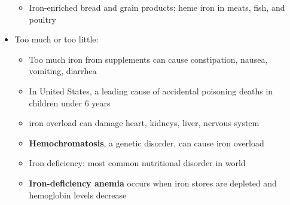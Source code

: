 \documentclass[12pt]{article}
\begin{document}
\begin{itemize}
\begin{itemize}
                        \item Iron-enriched bread and grain products; heme iron in meats, fish, and poultry
                    \end{itemize}
                \item Too much or too little:
                    \begin{itemize}
                        \item Too much iron from supplements can cause constipation, nausea, vomiting, diarrhea
                        \item In United States, a leading cause of accidental poisoning deaths in children under 6 years
                        \item iron overload can damage heart, kidneys, liver, nervous system
                        \item \textbf{Hemochromatosis}, a genetic disorder, can cause iron overload
                        \item Iron deficiency: most common nutritional disorder in world
                        \item \textbf{Iron-deficiency anemia} occurs when iron stores are depleted and hemoglobin levels decrease
                    \end{itemize}
            \end{itemize}
\end{document}
